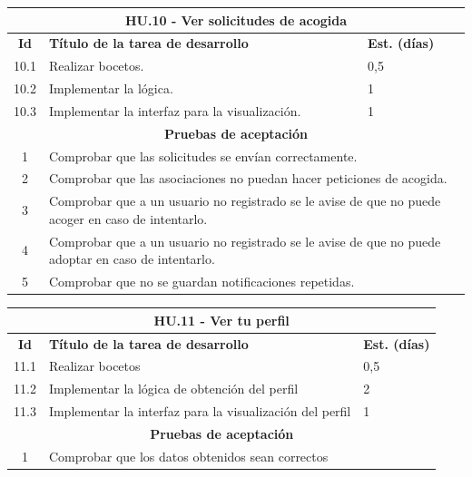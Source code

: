 \begin{table}[H]
	\centering
\begin{tabular}{|c|p{9.5cm}|p{1cm}|}
	\hline
	\multicolumn{3}{|c|}{\textbf{HU.10 - Ver solicitudes de acogida}} \\
	\hline
	\textbf{Id} & \textbf{Título de la tarea de desarrollo} & \textbf{Est. (días)} \\
	\hline
	10.1 & Realizar bocetos. & 0,5 \\ \hline
	10.2 &  Implementar la lógica. & 1 \\ \hline
	10.3 &  Implementar la interfaz para la visualización. & 1 \\ \hline
	\multicolumn{3}{|c|}{\textbf{Pruebas de aceptación}} \\ \hline
	1 & \multicolumn{2}{|p{10cm}|}{Comprobar que las solicitudes se envían correctamente.} \\ \hline
	2 & \multicolumn{2}{|p{10cm}|}{Comprobar que las asociaciones no puedan hacer peticiones de acogida.} \\ \hline
	3 & \multicolumn{2}{|p{10cm}|}{Comprobar que a un usuario no registrado se le avise de que no puede acoger en caso de intentarlo.} \\ \hline
	4 & \multicolumn{2}{|p{10cm}|}{Comprobar que a un usuario no registrado se le avise de que no puede adoptar en caso de intentarlo.} \\ \hline
	5 & \multicolumn{2}{|p{10cm}|}{Comprobar que no se guardan notificaciones repetidas.} \\ \hline
	
\end{tabular}
\end{table}


\begin{table}[H]
	\centering
\begin{tabular}{|c|p{9.5cm}|p{1cm}|}
	\hline
	\multicolumn{3}{|c|}{\textbf{HU.11 - Ver tu perfil}} \\
	\hline
	\textbf{Id} & \textbf{Título de la tarea de desarrollo} & \textbf{Est. (días)} \\
	\hline
	11.1 & Realizar bocetos & 0,5 \\ \hline
	11.2 &  Implementar la lógica de obtención del perfil & 2 \\ \hline
	11.3 &  Implementar la interfaz para la visualización del perfil & 1 \\ \hline
	\multicolumn{3}{|c|}{\textbf{Pruebas de aceptación}} \\ \hline
	1 & \multicolumn{2}{|p{10cm}|}{Comprobar que los datos obtenidos sean correctos} \\ \hline
	
\end{tabular}
\end{table}

